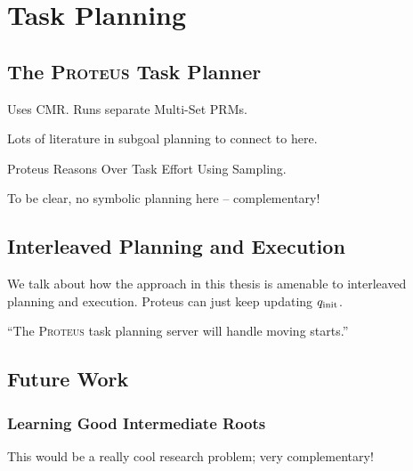 \chapter{Task Planning}
\label{chap:task-planning}

\section{The \textsc{Proteus} Task Planner}

Uses CMR.
Runs separate Multi-Set PRMs.

Lots of literature in subgoal planning to connect to here.

Proteus Reasons Over Task Effort Using Sampling.

To be clear, no symbolic planning here --
complementary!

\section{Interleaved Planning and Execution}
\label{sec:interleaved}

We talk about how the approach in this thesis is
amenable to interleaved planning and execution.
Proteus can just keep updating $q_{\mbox{\scriptsize init}}$.

``The \textsc{Proteus} task planning server
will handle moving starts.''

\section{Future Work}

\subsection{Learning Good Intermediate Roots}
\label{subsec:learning-good-intermediate-roots}

This would be a really cool research problem;
very complementary!
